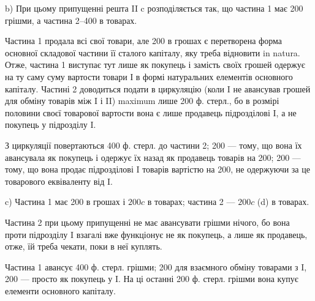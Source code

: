 b) При цьому припущенні решта II c розподіляється так, що частина
1 має 200 грішми, а частина 2--400 в товарах.

Частина 1 продала всі свої товари, але 200 в грошах є перетворена
форма основної складової частини її сталого капіталу, яку треба відновити
in natura. Отже, частина 1 виступає тут лише як покупець і замість
своїх грошей одержує на ту саму суму вартости товари І в формі натуральних
елементів основного капіталу. Частині 2 доводиться подати в
циркуляцію (коли I не авансував грошей для обміну товарів між I і II)
maximum лише 200 ф. стерл., бо в розмірі половини своєї товарової
вартости вона є лише продавець підрозділові I, а не покупець у
підрозділу I.

З циркуляції повертаються 400 ф. стерл. до частини 2; 200 — тому,
що вона їх авансувала як покупець і одержує їх назад як продавець
товарів на 200; 200 — тому, що вона продає підрозділові I товарів вартістю
на 200, не одержуючи за це товарового еквіваленту від I.

c) Частина 1 має 200 в грошах і $200 c$ в товарах; частина 2 —
$200 c$ (d) в товарах.

Частина 2 при цьому припущенні не має авансувати грішми нічого,
бо вона проти підрозділу I взагалі вже функціонує не як покупець, а
лише як продавець, отже, їй треба чекати, поки в неї куплять.

Частина 1 авансує 400 ф. стерл. грішми; 200 для взаємного обміну
товарами з I, 200 — просто як покупець у I. На ці останні 200 ф. стерл.
грішми вона купує елементи основного капіталу.

